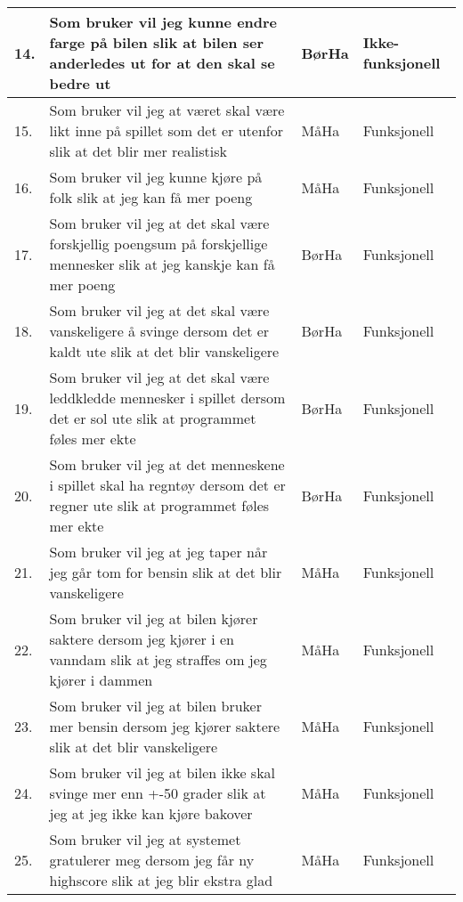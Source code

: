 \documentclass[norsk,a4paper]{article}
\begin{document}
\begin{center}
\begin{tabular}{ | m{0.4cm} | m{6.1cm} | m{2cm} | m{3cm} | }
\end{tabular}

\begin{tabular}{ | m{0.4cm} | m{6.1cm} | m{2cm} | m{3cm} | }
\hline
14. & Som bruker vil jeg kunne endre farge på bilen slik at bilen ser anderledes
ut for at den skal se bedre ut & BørHa & Ikke-funksjonell 
\\ \hline
15. & Som bruker vil jeg at været skal være likt inne på spillet som det er
utenfor slik at det blir mer realistisk & MåHa & Funksjonell 
\\ \hline
16. & Som bruker vil jeg kunne kjøre på folk slik at jeg kan få mer poeng 
& MåHa & Funksjonell 
\\ \hline
17. & Som bruker vil jeg at det skal være forskjellig poengsum på forskjellige
mennesker slik at jeg kanskje kan få mer poeng & BørHa & Funksjonell 
\\ \hline
18. & Som bruker vil jeg at det skal være vanskeligere å svinge dersom det er
kaldt ute slik at det blir vanskeligere & BørHa & Funksjonell 
\\ \hline
19. & Som bruker vil jeg at det skal være leddkledde mennesker i spillet dersom
det er sol ute slik at programmet føles mer ekte & BørHa & Funksjonell
\\ \hline
20. & Som bruker vil jeg at det menneskene i spillet skal ha regntøy dersom
det er regner ute slik at programmet føles mer ekte & BørHa & Funksjonell
\\ \hline
21. & Som bruker vil jeg at jeg taper når jeg går tom for bensin slik at det
blir vanskeligere & MåHa & Funksjonell
\\ \hline
22. & Som bruker vil jeg at bilen kjører saktere dersom jeg kjører i en vanndam
slik at jeg straffes om jeg kjører i dammen & MåHa & Funksjonell
\\ \hline
23. & Som bruker vil jeg at bilen bruker mer bensin dersom jeg kjører saktere
slik at det blir vanskeligere & MåHa & Funksjonell
\\ \hline
24. & Som bruker vil jeg at bilen ikke skal svinge mer enn +-50 grader slik at
jeg at jeg ikke kan kjøre bakover & MåHa & Funksjonell 
\\ \hline
25. & Som bruker vil jeg at systemet gratulerer meg dersom jeg får ny highscore
slik at jeg blir ekstra glad & MåHa & Funksjonell 
\\ \hline
\end{tabular}
\end{center}
\end{document}
